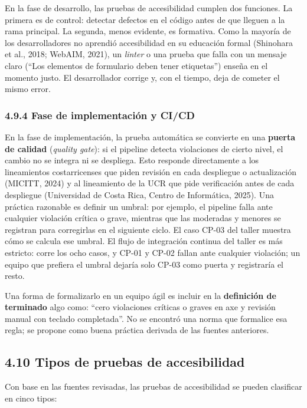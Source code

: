 \documentclass[10pt,letterpaper,onecolumn]{IEEEtran}
\begin{document}
En la fase de desarrollo, las pruebas de accesibilidad cumplen dos funciones. La primera es de control: detectar defectos en el código antes de que lleguen a la rama principal. La segunda, menos evidente, es formativa. Como la mayoría de los desarrolladores no aprendió accesibilidad en su educación formal (Shinohara et al., 2018; WebAIM, 2021), un \emph{linter} o una prueba que falla con un mensaje claro (``Los elementos de formulario deben tener etiquetas'') enseña en el momento justo. El desarrollador corrige y, con el tiempo, deja de cometer el mismo error.

\subsubsection{4.9.4 Fase de implementación y CI/CD}\label{fase-de-implementaciuxf3n-y-cicd}

En la fase de implementación, la prueba automática se convierte en una \textbf{puerta de calidad} (\emph{quality gate}): si el pipeline detecta violaciones de cierto nivel, el cambio no se integra ni se despliega. Esto responde directamente a los lineamientos costarricenses que piden revisión en cada despliegue o actualización (MICITT, 2024) y al lineamiento de la UCR que pide verificación antes de cada despliegue (Universidad de Costa Rica, Centro de Informática, 2025). Una práctica razonable es definir un umbral: por ejemplo, el pipeline falla ante cualquier violación crítica o grave, mientras que las moderadas y menores se registran para corregirlas en el siguiente ciclo. El caso CP-03 del taller muestra cómo se calcula ese umbral. El flujo de integración continua del taller es más estricto: corre los ocho casos, y CP-01 y CP-02 fallan ante cualquier violación; un equipo que prefiera el umbral dejaría solo CP-03 como puerta y registraría el resto.

Una forma de formalizarlo en un equipo ágil es incluir en la \textbf{definición de terminado} algo como: ``cero violaciones críticas o graves en axe y revisión manual con teclado completada''. No se encontró una norma que formalice esa regla; se propone como buena práctica derivada de las fuentes anteriores.

\subsection{4.10 Tipos de pruebas de accesibilidad}\label{tipos-de-pruebas-de-accesibilidad}

Con base en las fuentes revisadas, las pruebas de accesibilidad se pueden clasificar en cinco tipos:
\end{document}
